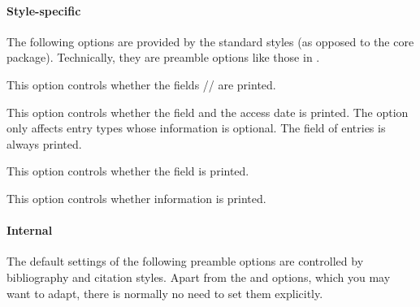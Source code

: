 \documentclass{ltxdockit}[2011/03/25]
\begin{document}
\paragraph{Style-specific}
\label{use:opt:pre:bbx}

The following options are provided by the standard styles (as opposed to the core package). Technically, they are preamble options like those in .

\begin{optionlist}


This option controls whether the fields \slash {}\slash {} are printed.


This option controls whether the  field and the access date is printed. The option only affects entry types whose  information is optional. The  field of  entries is always printed.


This option controls whether the field  is printed.


This option controls whether  information is printed.

\end{optionlist}

\paragraph{Internal}
\label{use:opt:pre:int}

The default settings of the following preamble options are controlled by bibliography and citation styles. Apart from the  and  options, which you may want to adapt, there is normally no need to set them explicitly.
\end{document}
